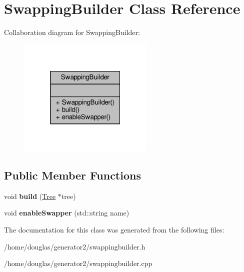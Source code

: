 \hypertarget{classSwappingBuilder}{}\section{Swapping\+Builder Class Reference}
\label{classSwappingBuilder}


Collaboration diagram for Swapping\+Builder\+:
\nopagebreak
\begin{figure}[H]
\begin{center}
\leavevmode
\includegraphics[width=184pt]{classSwappingBuilder__coll__graph}
\end{center}
\end{figure}
\subsection*{Public Member Functions}
\begin{DoxyCompactItemize}
\item 
void {\bfseries build} (\hyperlink{classTree}{Tree} $\ast$tree)\hypertarget{classSwappingBuilder_a813d17403b7e0d5bc073eafe8827955f}{}\label{classSwappingBuilder_a813d17403b7e0d5bc073eafe8827955f}

\item 
void {\bfseries enable\+Swapper} (std\+::string name)\hypertarget{classSwappingBuilder_a83eec69297b400b6255111c583c47961}{}\label{classSwappingBuilder_a83eec69297b400b6255111c583c47961}

\end{DoxyCompactItemize}


The documentation for this class was generated from the following files\+:\begin{DoxyCompactItemize}
\item 
/home/douglas/generator2/swappingbuilder.\+h\item 
/home/douglas/generator2/swappingbuilder.\+cpp\end{DoxyCompactItemize}
